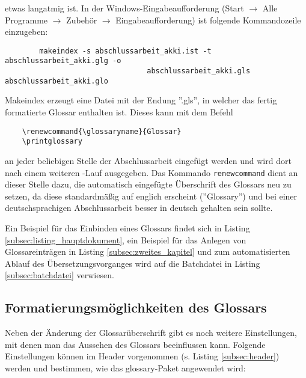 etwas langatmig ist. In der Windows-Eingabeaufforderung (Start $\rightarrow$ Alle Programme
$\rightarrow$ Zubehör $\rightarrow$ Eingabeaufforderung) ist folgende Kommandozeile einzugeben:
\begin{verbatim}
		makeindex -s abschlussarbeit_akki.ist -t abschlussarbeit_akki.glg -o
								 abschlussarbeit_akki.gls abschlussarbeit_akki.glo
\end{verbatim}
Makeindex erzeugt eine Datei mit der Endung ''.gls'', in welcher das fertig formatierte Glossar
enthalten ist. Dieses kann mit dem Befehl
\begin{verbatim}
	\renewcommand{\glossaryname}{Glossar}
	\printglossary
\end{verbatim}
an jeder beliebigen Stelle der Abschlussarbeit eingefügt werden und wird dort nach einem weiteren
\DMLLaTeX-Lauf ausgegeben. Das Kommando \texttt{renewcommand} dient an dieser Stelle dazu, die
automatisch eingefügte Überschrift des Glossars neu zu setzen, da diese standardmäßig auf
englich erscheint (''Glossary'') und bei einer deutschsprachigen Abschlussarbeit besser in deutsch
gehalten sein sollte.

Ein Beispiel für das Einbinden eines Glossars findet sich in Listing
\ref{subsec:listing_hauptdokument}, ein Beispiel für das Anlegen von Glossareinträgen in Listing
\ref{subsec:zweites_kapitel} und zum automatisierten Ablauf des Übersetzungsvorganges wird auf
die Batchdatei in Listing \ref{subsec:batchdatei} verwiesen.

\subsection{Formatierungsmöglichkeiten des Glossars}
Neben der Änderung der Glossarüberschrift gibt es noch weitere Einstellungen, mit denen man das
Aussehen des Glossars beeinflussen kann. Folgende Einstellungen können im Header vorgenommen
(s. Listing \ref{subsec:header}) werden und bestimmen, wie das glossary-Paket angewendet wird:

